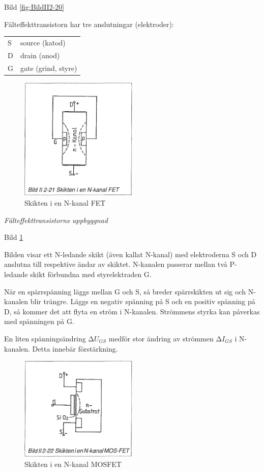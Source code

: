 Bild \ref{fig:BildII2-20}

Fälteffekttransistorn har tre anslutningar (elektroder):

\begin{tabular}{ll}
  S & source (katod) \\
  D & drain (anod) \\
  G & gate (grind, styre) \\
\end{tabular}

\begin{figure}
\includegraphics[width=0.5\textwidth]{images/bild_2_2-21}
\caption{Skikten i en N-kanal FET}
\label{fig:BildII2-21}
\end{figure}

\emph{Fälteffekttransistorns uppbyggnad}

Bild \ref{fig:BildII2-21}

Bilden visar ett N-ledande skikt (även kallat N-kanal) med elektroderna S och D
anslutna till respektive ändar av skiktet. N-kanalen passerar mellan två
P-ledande skikt förbundna med styrelektraden G.

När en spärrspänning läggs mellan G och S, så breder spärrskikten ut sig och
N-kanalen blir trängre. Läggs en negativ spänning på S och en positiv spänning
på D, så kommer det att flyta en ström i N-kanalen. Strömmens styrka kan
påverkas med spänningen på G.

En liten spänningsändring \(∆U_{GS}\) medför stor ändring av strömmen
\(∆I_{GS}\) i N-kanalen. Detta innebär förstärkning.

\begin{figure}
\includegraphics[width=0.5\textwidth]{images/bild_2_2-22}
\caption{Skikten i en N-kanal MOSFET}
\label{fig:BildII2-22}
\end{figure}


